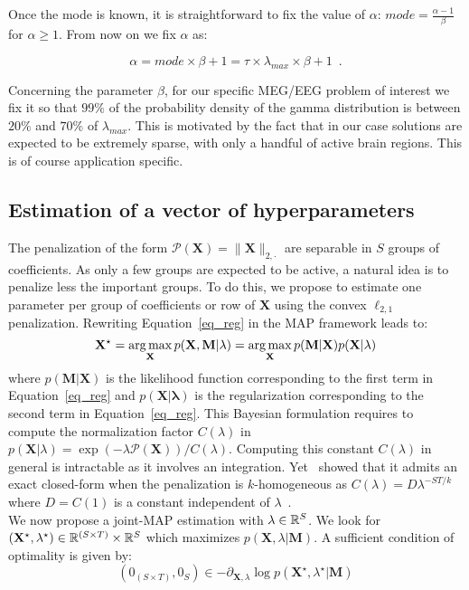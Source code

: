 Once the mode is known, it is straightforward to fix the value of $\alpha$: $mode =\frac{\alpha - 1}{\beta}$ for $\alpha \ge 1$. From now on we fix $\alpha$ as:

\begin{equation}
\alpha = mode \times \beta + 1 = \tau\times \lambda_{max} \times \beta + 1 \enspace .
\end{equation}

Concerning the parameter $\beta$, for our specific MEG/EEG problem of interest we fix it so that $99\%$ of the probability density of the gamma distribution is between $20\%$ and $70\%$ of $\lambda_{max}$. This is motivated by the fact that in our case solutions are expected to be extremely sparse, with only a handful of active brain regions. This is of course application specific.
 
\subsection{Estimation of a vector of hyperparameters}

The penalization of the form $\mathcal{P}(\mathbf{X})=\|\mathbf{X}\|_{2,\cdot}$ are separable in $S$ groups of coefficients.
As only a few groups are expected to be active, a natural idea is to penalize less the important groups. To do this, we propose to estimate one parameter per group of coefficients or row of $\mathbf{X}$ using the convex $\ell_{2,1}$ penalization. Rewriting Equation~\eqref{eq_reg} in the MAP framework leads to: 
\begin{equation}
\mathbf{X}^\star = \mathop{\mathrm{arg}\,\mathrm{max}}_{\mathbf{X}}
p(\mathbf{X}, \mathbf{M}|\lambda) = \mathop{\mathrm{arg}\,\mathrm{max}}_{\mathbf{X}} p(\mathbf{M}|\mathbf{X})p(\mathbf{X}|\lambda) 
\end{equation}
where $p(\mathbf{M}|\mathbf{X})$ is the likelihood function corresponding to the first term in Equation~\eqref{eq_reg} and $p(\mathbf{X|\lambda})$ is the regularization corresponding to the second term in Equation~\eqref{eq_reg}. This Bayesian formulation requires to compute the normalization factor $C(\lambda)$ in $p(\mathbf{X}|\lambda)=\exp(-\lambda\mathcal{P}(\mathbf{X}))/C(\lambda)$. Computing this constant $C(\lambda)$ in general is intractable as it involves an integration. Yet~\cite{Figueiredo} showed that it admits an exact closed-form when the penalization is $k$-homogeneous as $C(\lambda)=D\lambda^{-ST/k}$ where $D=C(1)$ is a constant independent of $\lambda$~\cite{Figueiredo}.\\

We now propose a joint-MAP estimation with $\lambda\in\mathbb{R}^S$.
We look for $(\mathbf{X}^\star, \lambda^\star) \in\mathbb{R}^{(S\times T)} \times \mathbb{R}^{S}$ which maximizes $p(\mathbf{X}, \lambda|\mathbf{M})$. A sufficient condition of optimality is given by:
\begin{equation} \label{eq7}
(0_{(S\times T)}, 0_{S}) \in -\partial_{\mathbf{X},\lambda} \log p(\mathbf{X^\star}, \lambda^\star|\mathbf{M})
\end{equation}

